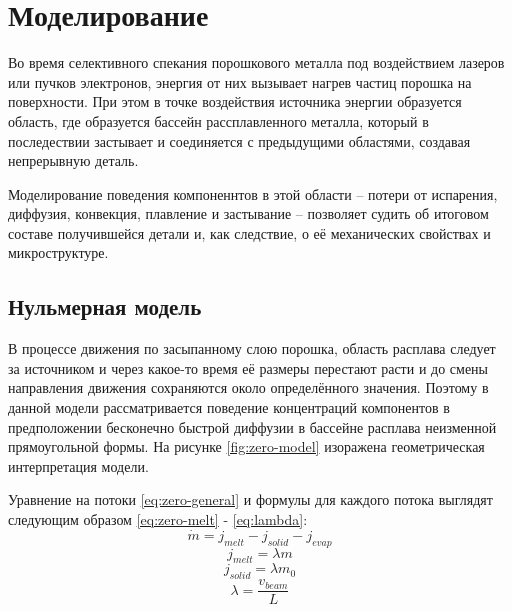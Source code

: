 \section{Моделирование}

Во время селективного спекания порошкового металла под воздействием лазеров или пучков электронов, энергия от них вызывает нагрев частиц порошка на поверхности. 
При этом в точке воздействия источника энергии образуется область, где образуется бассейн рассплавленного металла, который в последествии застывает и соединяется с предыдущими областями, создавая непрерывную деталь.

Моделирование поведения компоненнтов в этой области -- потери от испарения, диффузия, конвекция, плавление и застывание -- позволяет судить об итоговом составе получившейся детали и, как следствие, о её механических свойствах и микроструктуре.

\subsection{Нульмерная модель}

В процессе движения по засыпанному слою порошка, область расплава следует за источником и через какое-то время её размеры перестают расти и до смены направления движения сохраняются около определённого значения. 
Поэтому в данной модели рассматривается поведение концентраций компонентов в предположении бесконечно быстрой диффузии в бассейне расплава неизменной 
прямоугольной формы. На рисунке \ref{fig:zero-model} изоражена геометрическая интерпретация модели.

Уравнение на потоки \ref{eq:zero-general} и формулы для каждого потока выглядят следующим образом \ref{eq:zero-melt} - \ref{eq:lambda}:
\begin{equation}
    \label{eq:zero-general}
    \dot{m} = j_{melt} - j_{solid} - j_{evap}
\end{equation}
\begin{equation}
    \label{eq:zero-melt}
    j_{melt} = \lambda m
\end{equation}
\begin{equation}
    \label{eq:zer-sol}
    j_{solid} = \lambda m_0
\end{equation}
\begin{equation}
    \label{eq:lambda}
    \lambda = \frac{v_{beam}}{L}
\end{equation}

